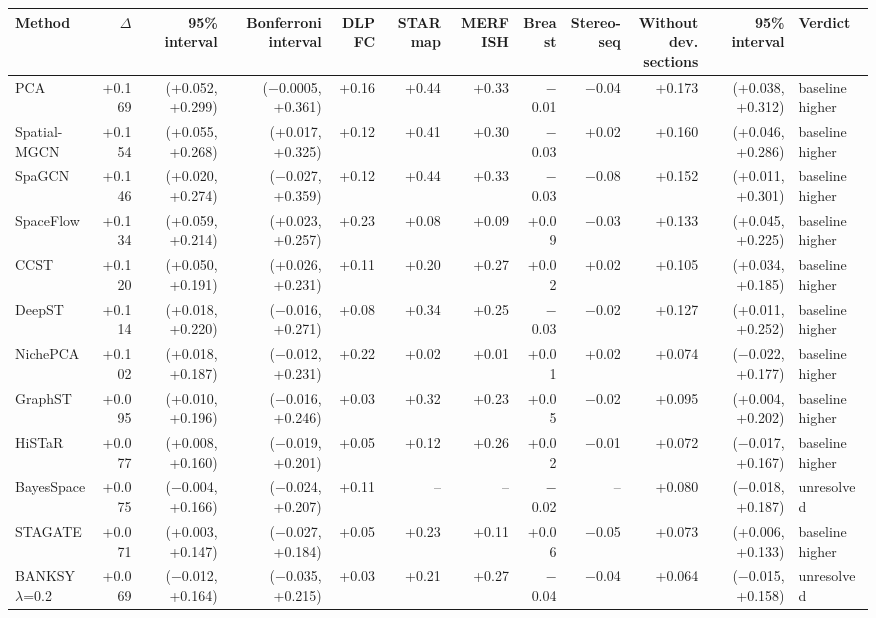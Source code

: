 \scriptsize
\begin{tabular}{lrrrrrrrrrrl}
\toprule
Method & $\Delta$ & 95\% interval & Bonferroni interval & DLPFC & STARmap & MERFISH & Breast & Stereo-seq & \shortstack{Without\\dev. sections} & 95\% interval & Verdict \\
\midrule
PCA & +0.169 & (+0.052, +0.299) & ($-$0.0005, +0.361) & +0.16 & +0.44 & +0.33 & $-$0.01 & $-$0.04 & +0.173 & (+0.038, +0.312) & baseline higher \\
Spatial-MGCN & +0.154 & (+0.055, +0.268) & (+0.017, +0.325) & +0.12 & +0.41 & +0.30 & $-$0.03 & +0.02 & +0.160 & (+0.046, +0.286) & baseline higher \\
SpaGCN & +0.146 & (+0.020, +0.274) & ($-$0.027, +0.359) & +0.12 & +0.44 & +0.33 & $-$0.03 & $-$0.08 & +0.152 & (+0.011, +0.301) & baseline higher \\
SpaceFlow & +0.134 & (+0.059, +0.214) & (+0.023, +0.257) & +0.23 & +0.08 & +0.09 & +0.09 & $-$0.03 & +0.133 & (+0.045, +0.225) & baseline higher \\
CCST & +0.120 & (+0.050, +0.191) & (+0.026, +0.231) & +0.11 & +0.20 & +0.27 & +0.02 & +0.02 & +0.105 & (+0.034, +0.185) & baseline higher \\
DeepST & +0.114 & (+0.018, +0.220) & ($-$0.016, +0.271) & +0.08 & +0.34 & +0.25 & $-$0.03 & $-$0.02 & +0.127 & (+0.011, +0.252) & baseline higher \\
NichePCA & +0.102 & (+0.018, +0.187) & ($-$0.012, +0.231) & +0.22 & +0.02 & +0.01 & +0.01 & +0.02 & +0.074 & ($-$0.022, +0.177) & baseline higher \\
GraphST & +0.095 & (+0.010, +0.196) & ($-$0.016, +0.246) & +0.03 & +0.32 & +0.23 & +0.05 & $-$0.02 & +0.095 & (+0.004, +0.202) & baseline higher \\
HiSTaR & +0.077 & (+0.008, +0.160) & ($-$0.019, +0.201) & +0.05 & +0.12 & +0.26 & +0.02 & $-$0.01 & +0.072 & ($-$0.017, +0.167) & baseline higher \\
BayesSpace & +0.075 & ($-$0.004, +0.166) & ($-$0.024, +0.207) & +0.11 & -- & -- & $-$0.02 & -- & +0.080 & ($-$0.018, +0.187) & unresolved \\
STAGATE & +0.071 & (+0.003, +0.147) & ($-$0.027, +0.184) & +0.05 & +0.23 & +0.11 & +0.06 & $-$0.05 & +0.073 & (+0.006, +0.133) & baseline higher \\
BANKSY $\lambda$=0.2 & +0.069 & ($-$0.012, +0.164) & ($-$0.035, +0.215) & +0.03 & +0.21 & +0.27 & $-$0.04 & $-$0.04 & +0.064 & ($-$0.015, +0.158) & unresolved \\

\end{tabular}
